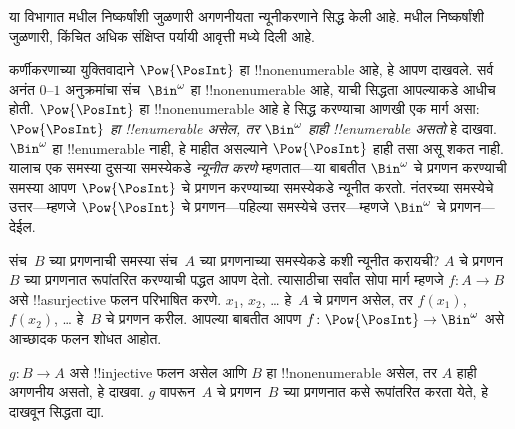 \documentclass[../../../include/open-logic-section]{subfiles}
\begin{document}


\begin{editorial}
  या विभागात  मधील निष्कर्षांशी जुळणारी अगणनीयता
  न्यूनीकरणाने सिद्ध केली आहे.  मधील निष्कर्षांशी
  जुळणारी, किंचित अधिक संक्षिप्त पर्यायी आवृत्ती 
  मध्ये दिली आहे.
\end{editorial}

कर्णीकरणाच्या युक्तिवादाने $\Pow{\PosInt}$ हा !!{nonenumerable} आहे,
हे आपण दाखवले. सर्व अनंत $0$--$1$ अनुक्रमांचा संच~$\Bin^\omega$ हा
!!{nonenumerable} आहे, याची सिद्धता आपल्याकडे आधीच होती.
$\Pow{\PosInt}$ हा !!{nonenumerable} आहे हे सिद्ध करण्याचा आणखी एक मार्ग
असा: \emph{$\Pow{\PosInt}$ हा !!{enumerable} असेल, तर $\Bin^\omega$
  हाही !!{enumerable} असतो} हे दाखवा. $\Bin^\omega$ हा !!{enumerable}
नाही, हे माहीत असल्याने $\Pow{\PosInt}$ हाही तसा असू शकत नाही. यालाच
एक समस्या दुसऱ्या समस्येकडे \emph{न्यूनीत करणे} म्हणतात---या बाबतीत
$\Bin^\omega$ चे प्रगणन करण्याची समस्या आपण $\Pow{\PosInt}$ चे प्रगणन
करण्याच्या समस्येकडे न्यूनीत करतो. नंतरच्या समस्येचे उत्तर---म्हणजे
$\Pow{\PosInt}$ चे प्रगणन---पहिल्या समस्येचे उत्तर---म्हणजे
$\Bin^\omega$ चे प्रगणन---देईल.

संच~$B$ च्या प्रगणनाची समस्या संच~$A$ च्या प्रगणनाच्या समस्येकडे कशी
न्यूनीत करायची? $A$ चे प्रगणन $B$ च्या प्रगणनात रूपांतरित करण्याची
पद्धत आपण देतो. त्यासाठीचा सर्वांत सोपा मार्ग म्हणजे
$f\colon A \to B$ असे !!a{surjective} फलन परिभाषित करणे. $x_1$, $x_2$,
\dots{} हे~$A$ चे प्रगणन असेल, तर $f(x_1)$, $f(x_2)$, \dots{} हे~$B$
चे प्रगणन करील. आपल्या बाबतीत आपण
$f\colon \Pow{\PosInt} \to \Bin^\omega$ असे आच्छादक फलन शोधत आहोत.

\begin{prob}
$g\colon B \to A$ असे !!{injective} फलन असेल आणि $B$ हा
!!{nonenumerable} असेल, तर $A$ हाही अगणनीय असतो, हे दाखवा.
$g$ वापरून~$A$ चे प्रगणन~$B$ च्या प्रगणनात कसे रूपांतरित करता येते,
हे दाखवून सिद्धता द्या.
\end{prob}
\end{document}
